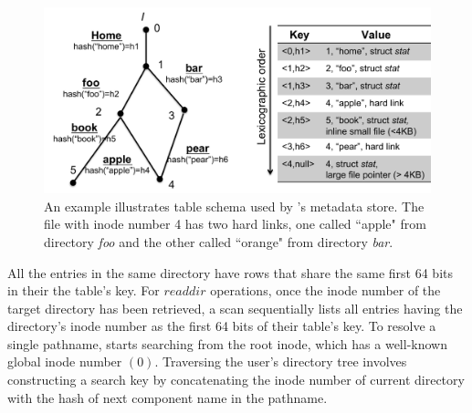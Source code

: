 \begin{figure}[!ht]
\centering
\includegraphics[scale=0.35]{figs/schema}
\caption{An example illustrates table schema used by \tfs's metadata store.
         The file with inode number 4 has two hard links,
         one called ``apple" from directory \textit{foo} and 
         the other called ``orange" from directory \textit{bar}.}
\label{fig:schema}
\end{figure}

All the entries in the same directory have rows that 
share the same first 64 bits in their the table's key.
For $readdir$ operations, once the inode number
of the target directory has been retrieved, 
a scan sequentially lists all entries having 
the directory's inode number as the first 64 bits of their table's key. 
To resolve a single pathname, \tfs starts searching from the root inode, 
which has a well-known global inode number $(0)$.
Traversing the user's directory tree
involves constructing a search key by concatenating the inode 
number of current directory with the hash of
next component name in the pathname.
